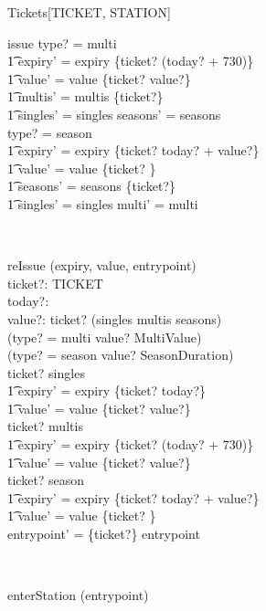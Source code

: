 \begin{class}{Tickets}[TICKET, STATION]
\begin{op}{issue}
type? = multi \implies\\
\t1 expiry' = expiry \cup \{ticket? \mapsto (today? + 730)\} \land \\ 
\t1 value' = value \cup \{ticket? \mapsto value?\} \land \\ 
\t1 multis' = multis \cup \{ticket?\} \land \\ 
\t1 singles' = singles \land seasons' = seasons\\
type? = season \implies\\
\t1 expiry' = expiry \cup \{ticket? \mapsto today? + value?\} \land \\ 
\t1 value' = value \cup \{ticket? \} \land \\ 
\t1 seasons' = seasons \cup \{ticket?\} \land \\ 
\t1 singles' = singles \land  multi' = multi
\end{op}
\\ 
\begin{op}{reIssue}
\Delta (expiry, value, entrypoint)\\
ticket?: TICKET \\ 
today?:  \nat  \\ 
value?:  \nat  
\where
 ticket? \in (singles \cup multis \cup seasons) \land\\
     (type? = multi \implies value? \in MultiValue) \land\\
     (type? = season \implies value? \in SeasonDuration)\\
ticket? \in singles \implies\\
\t1 expiry' = expiry \oplus \{ticket? \mapsto today?\} \land \\ 
\t1 value' = value \oplus \{ticket? \mapsto value?\}\\ 
ticket? \in multis \implies\\
\t1 expiry' = expiry \oplus  \{ticket? \mapsto (today? + 730)\} \land \\ 
\t1 value' = value \oplus \{ticket? \mapsto value?\} \\ 
ticket? \in season \implies\\
\t1 expiry' = expiry \oplus \{ticket? \mapsto today? + value?\} \land \\ 
\t1 value' = value \oplus \{ticket? \}\\
entrypoint' = \{ticket?\} \ndres entrypoint
\end{op} \\ 
\begin{op}{enterStation}
\Delta (entrypoint)\\

\end{op}
\end{class}
